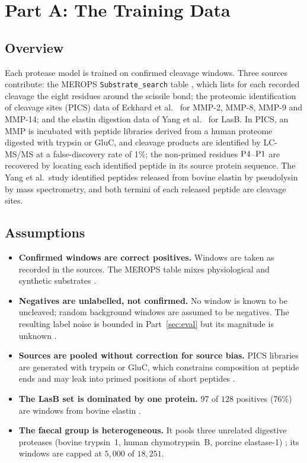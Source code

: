 \section{Part A: The Training Data}
\label{sec:data}

\subsection{Overview}

Each protease model is trained on confirmed cleavage windows. Three
sources contribute: the MEROPS \texttt{Substrate\_search} table ,
which lists for each recorded cleavage the eight residues around the
scissile bond; the proteomic identification of cleavage sites (PICS) data of
Eckhard et al.\  for MMP-2, MMP-8, MMP-9 and MMP-14; and the elastin
digestion data of Yang et al.\  for LasB. In PICS, an MMP is incubated
with peptide libraries derived from a human proteome digested with trypsin or
GluC, and cleavage products are identified by LC-MS/MS at a false-discovery
rate of 1\%; the non-primed residues $\mathrm{P}4$--$\mathrm{P}1$ are recovered by
locating each identified peptide in its source protein sequence. The Yang et
al.\ study identified peptides released from bovine elastin by pseudolysin by
mass spectrometry, and both termini of each released peptide are cleavage
sites.

\subsection{Assumptions}

\begin{assump}
\begin{itemize}[leftmargin=*,noitemsep]
\item \textbf{Confirmed windows are correct positives.} Windows are taken as
  recorded in the sources. The MEROPS table mixes physiological and synthetic
  substrates \FLAG.
\item \textbf{Negatives are unlabelled, not confirmed.} No window is known
  to be uncleaved; random background windows are assumed to be negatives.
  The resulting label noise is bounded in Part~\ref{sec:eval} but its
  magnitude is unknown \FLAG.
\item \textbf{Sources are pooled without correction for source bias.} PICS
  libraries are generated with trypsin or GluC, which constrains composition
  at peptide ends and may leak into primed positions of short peptides
  \FLAG.
\item \textbf{The LasB set is dominated by one protein.} $97$ of $128$
  positives ($76\%$) are windows from bovine elastin \CONF.
\item \textbf{The faecal group is heterogeneous.} It pools three
  unrelated digestive proteases (bovine trypsin~1, human chymotrypsin~B,
  porcine elastase-1) \CONF; its windows are capped at $5{,}000$ of $18{,}251$.
\end{itemize}
\end{assump}

